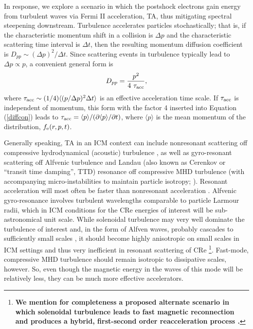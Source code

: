 \documentclass[twocolumn]{aastex61}
\begin{document}
In response, we explore a scenario in which the postshock electrons gain energy from turbulent waves via Fermi II acceleration, TA,
thus mitigating spectral steepening downstream. Turbulence accelerates particles stochastically; that is, if the characteristic momentum shift in a collision is $\Delta p$ and the characteristic scattering time interval is $\Delta t$, then the resulting momentum diffusion coefficient is $D_{pp} \sim (\Delta p)^2/\Delta t$. Since scattering events in turbulence typically lead to $\Delta p \propto p$, a convenient general form is 
\begin{equation}
D_{pp} = { p^2 \over {4\ \tau_{\rm acc}}}, 
\label{Dpp}
\end{equation}
where $\tau_{\rm acc} \sim (1/4) \langle(p/\Delta p)^2 \Delta t \rangle$ is an effective acceleration time scale. 
If $\tau_{\rm acc}$ is independent of momentum, this form with the factor 4 inserted into Equation (\ref{diffcon}) leads to $\tau_{\rm acc} = \langle p \rangle /(\partial \langle p \rangle /\partial t)$, 
where $\langle p \rangle$ is the mean momentum of the distribution, $f_{\rm e}(r,p,t)$.

Generally speaking, TA in an ICM context can include nonresonant scattering off compressive hydrodynamical (acoustic) turbulence \citep[e.g.,][]{ptuskin1988}, as well as gyro-resonant scattering off Alfvenic turbulence \citep[e.g.,][]{fujita2015} and Landau (also known as Cerenkov or ``transit time damping'', TTD) resonance off compressive MHD turbulence (with accompanying micro-instabilities to maintain particle isotropy; \citep[e.g.,][]{brunetti2007, brunetti2011,lynn2014}). Resonant acceleration will most often be faster than nonresonant acceleration \citep[e.g.,][]{brunetti2007,miniati2015}. Alfvenic gyro-resonance involves turbulent wavelengths comparable to particle Larmour radii, which in ICM conditions for the CRe energies of interest will be sub-astronomical unit scale. While solenoidal turbulence may very well dominate the turbulence of interest \citep[e.g.,][]{porter2015} and, in the form of Alfven waves, probably cascades to sufficiently small scales \citep[e.g.,][]{kowal2010}, it should become highly anisotropic on small scales in ICM settings and thus very inefficient in resonant scattering of CRe \citep[e.g.,][]{yan2002}\footnote{\bf We mention for completeness a proposed alternate scenario in which solenoidal turbulence leads to fast magnetic reconnection and produces a hybrid, first-second order reacceleration process \citep{brunetti2016}.}. Fast-mode, compressive MHD turbulence should remain isotropic to dissipative scales, however. 
So, even though the magnetic energy in the waves of this mode will be relatively less, they can be much more effective accelerators.
\end{document}
